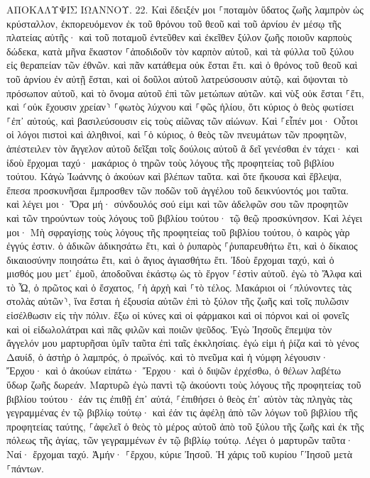 \documentclass[twoside, 9pt]{extreport}
\begin{document}
ΑΠΟΚΑΛΥΨΙΣ ΙΩΑΝΝΟΥ.
22.
Καὶ ἔδειξέν μοι ⸀ποταμὸν ὕδατος ζωῆς λαμπρὸν ὡς κρύσταλλον, ἐκπορευόμενον ἐκ τοῦ θρόνου τοῦ θεοῦ καὶ τοῦ ἀρνίου 
ἐν μέσῳ τῆς πλατείας αὐτῆς· καὶ τοῦ ποταμοῦ ἐντεῦθεν καὶ ἐκεῖθεν ξύλον ζωῆς ποιοῦν καρποὺς δώδεκα, κατὰ μῆνα ἕκαστον ⸀ἀποδιδοῦν τὸν καρπὸν αὐτοῦ, καὶ τὰ φύλλα τοῦ ξύλου εἰς θεραπείαν τῶν ἐθνῶν. 
καὶ πᾶν κατάθεμα οὐκ ἔσται ἔτι. καὶ ὁ θρόνος τοῦ θεοῦ καὶ τοῦ ἀρνίου ἐν αὐτῇ ἔσται, καὶ οἱ δοῦλοι αὐτοῦ λατρεύσουσιν αὐτῷ, 
καὶ ὄψονται τὸ πρόσωπον αὐτοῦ, καὶ τὸ ὄνομα αὐτοῦ ἐπὶ τῶν μετώπων αὐτῶν. 
καὶ νὺξ οὐκ ἔσται ⸀ἔτι, καὶ ⸂οὐκ ἔχουσιν χρείαν⸃ ⸀φωτὸς λύχνου καὶ ⸀φῶς ἡλίου, ὅτι κύριος ὁ θεὸς φωτίσει ⸀ἐπ᾽ αὐτούς, καὶ βασιλεύσουσιν εἰς τοὺς αἰῶνας τῶν αἰώνων. 
Καὶ ⸀εἶπέν μοι· Οὗτοι οἱ λόγοι πιστοὶ καὶ ἀληθινοί, καὶ ⸀ὁ κύριος, ὁ θεὸς τῶν πνευμάτων τῶν προφητῶν, ἀπέστειλεν τὸν ἄγγελον αὐτοῦ δεῖξαι τοῖς δούλοις αὐτοῦ ἃ δεῖ γενέσθαι ἐν τάχει· 
καὶ ἰδοὺ ἔρχομαι ταχύ· μακάριος ὁ τηρῶν τοὺς λόγους τῆς προφητείας τοῦ βιβλίου τούτου. 
Κἀγὼ Ἰωάννης ὁ ἀκούων καὶ βλέπων ταῦτα. καὶ ὅτε ἤκουσα καὶ ἔβλεψα, ἔπεσα προσκυνῆσαι ἔμπροσθεν τῶν ποδῶν τοῦ ἀγγέλου τοῦ δεικνύοντός μοι ταῦτα. 
καὶ λέγει μοι· Ὅρα μή· σύνδουλός σού εἰμι καὶ τῶν ἀδελφῶν σου τῶν προφητῶν καὶ τῶν τηρούντων τοὺς λόγους τοῦ βιβλίου τούτου· τῷ θεῷ προσκύνησον. 
Καὶ λέγει μοι· Μὴ σφραγίσῃς τοὺς λόγους τῆς προφητείας τοῦ βιβλίου τούτου, ὁ καιρὸς γὰρ ἐγγύς ἐστιν. 
ὁ ἀδικῶν ἀδικησάτω ἔτι, καὶ ὁ ῥυπαρὸς ⸀ῥυπαρευθήτω ἔτι, καὶ ὁ δίκαιος δικαιοσύνην ποιησάτω ἔτι, καὶ ὁ ἅγιος ἁγιασθήτω ἔτι. 
Ἰδοὺ ἔρχομαι ταχύ, καὶ ὁ μισθός μου μετ᾽ ἐμοῦ, ἀποδοῦναι ἑκάστῳ ὡς τὸ ἔργον ⸀ἐστὶν αὐτοῦ. 
ἐγὼ τὸ Ἄλφα καὶ τὸ Ὦ, ὁ πρῶτος καὶ ὁ ἔσχατος, ⸀ἡ ἀρχὴ καὶ ⸀τὸ τέλος. 
Μακάριοι οἱ ⸂πλύνοντες τὰς στολὰς αὐτῶν⸃, ἵνα ἔσται ἡ ἐξουσία αὐτῶν ἐπὶ τὸ ξύλον τῆς ζωῆς καὶ τοῖς πυλῶσιν εἰσέλθωσιν εἰς τὴν πόλιν. 
ἔξω οἱ κύνες καὶ οἱ φάρμακοι καὶ οἱ πόρνοι καὶ οἱ φονεῖς καὶ οἱ εἰδωλολάτραι καὶ πᾶς φιλῶν καὶ ποιῶν ψεῦδος. 
Ἐγὼ Ἰησοῦς ἔπεμψα τὸν ἄγγελόν μου μαρτυρῆσαι ὑμῖν ταῦτα ἐπὶ ταῖς ἐκκλησίαις. ἐγώ εἰμι ἡ ῥίζα καὶ τὸ γένος Δαυίδ, ὁ ἀστὴρ ὁ λαμπρός, ὁ πρωϊνός. 
καὶ τὸ πνεῦμα καὶ ἡ νύμφη λέγουσιν· Ἔρχου· καὶ ὁ ἀκούων εἰπάτω· Ἔρχου· καὶ ὁ διψῶν ἐρχέσθω, ὁ θέλων λαβέτω ὕδωρ ζωῆς δωρεάν. 
Μαρτυρῶ ἐγὼ παντὶ τῷ ἀκούοντι τοὺς λόγους τῆς προφητείας τοῦ βιβλίου τούτου· ἐάν τις ἐπιθῇ ἐπ᾽ αὐτά, ⸀ἐπιθήσει ὁ θεὸς ἐπ᾽ αὐτὸν τὰς πληγὰς τὰς γεγραμμένας ἐν τῷ βιβλίῳ τούτῳ· 
καὶ ἐάν τις ἀφέλῃ ἀπὸ τῶν λόγων τοῦ βιβλίου τῆς προφητείας ταύτης, ⸀ἀφελεῖ ὁ θεὸς τὸ μέρος αὐτοῦ ἀπὸ τοῦ ξύλου τῆς ζωῆς καὶ ἐκ τῆς πόλεως τῆς ἁγίας, τῶν γεγραμμένων ἐν τῷ βιβλίῳ τούτῳ. 
Λέγει ὁ μαρτυρῶν ταῦτα· Ναί· ἔρχομαι ταχύ. Ἀμήν· ⸀ἔρχου, κύριε Ἰησοῦ. 
Ἡ χάρις τοῦ κυρίου ⸀Ἰησοῦ μετὰ ⸀πάντων. 
\end{document}
